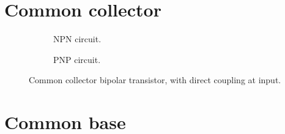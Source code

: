 \section{Common collector}

	
	\begin{figure}[htb]
		\centering
		\begin{subfigure}[b]{0.49\textwidth}
			\centering
			
			\caption{NPN circuit.%
				\label{fig__bip_npn_common_collector_direct_coupling}}
		\end{subfigure}
		\hfill
		\begin{subfigure}[b]{0.49\textwidth}
			\centering
			
			\caption{PNP circuit.%
				\label{fig__bip_pnp_common_collector_direct_coupling}}
		\end{subfigure}
		\caption{Common collector bipolar transistor, with direct coupling at input.%
			\label{fig__bip_common_collector_direct_coupling}}
	\end{figure}



\section{Common base}


